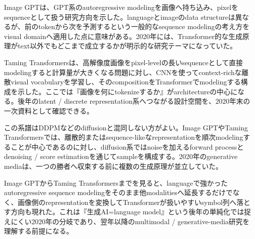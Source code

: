 Image GPTは、GPT系のautoregressive modelingを画像へ持ち込み、pixelをsequenceとして扱う研究方向を示した。languageとimageのdata structureは異なるが、前のtokenから次を予測するという一般的なsequence modelingの考え方をvisual domainへ適用した点に意味がある。2020年には、Transformer的な生成原理がtext以外でもどこまで成立するかが明示的な研究テーマになっていた。\autocite{src-d46ff01d5c8d}


Taming Transformersは、高解像度画像をpixel-levelの長いsequenceとして直接modelingすると計算量が大きくなる問題に対し、CNNを使ってcontext-richな離散visual vocabularyを学習し、そのcompositionをTransformerでmodelingする構成を示した。ここでは『画像を何にtokenizeするか』がarchitectureの中心になる。後年のlatent / discrete representation系へつながる設計空間を、2020年末の一次資料として確認できる。\autocite{src-03b656c5d291}


この系譜はDDPMなどのdiffusionと混同しない方がよい。Image GPTやTaming Transformersでは、離散的またはsequence-likeなrepresentationを順次modelingすることが中心であるのに対し、diffusion系ではnoiseを加えるforward processとdenoising / score estimationを通じてsampleを構成する。2020年のgenerative mediaは、一つの勝者へ収束する前に複数の生成原理が並立していた。\autocite{src-03b656c5d291,src-d46ff01d5c8d}


Image GPTからTaming Transformersまでを見ると、languageで強かったautoregressive sequence modelingをそのまま他modalitiesへ延長するだけでなく、画像側のrepresentationを変換してTransformerが扱いやすいsymbol列へ落とす方向も現れた。これは『生成AI=language model』という後年の単純化では捉えにくい2020年の分岐であり、翌年以降のmultimodal / generative-media研究を理解する前提になる。\autocite{src-03b656c5d291,src-d46ff01d5c8d}


